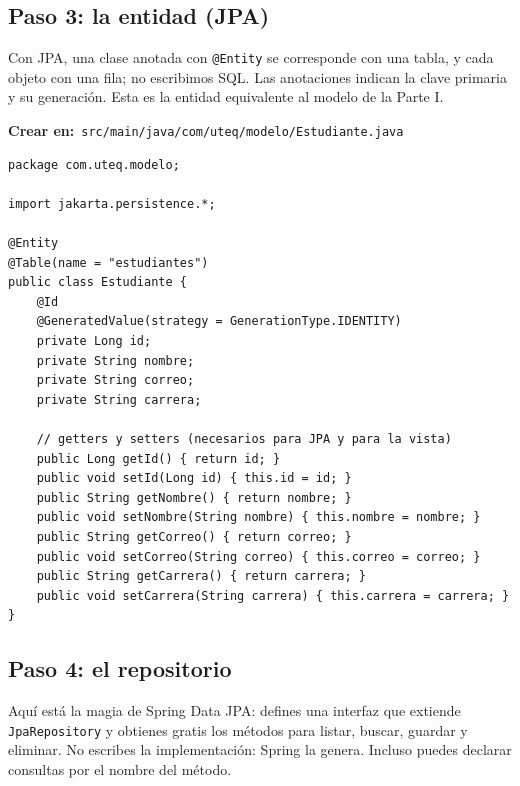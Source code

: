 \documentclass[11pt]{article}
\begin{document}
\subsection{Paso 3: la entidad (JPA)}
Con JPA, una clase anotada con \texttt{@Entity} se corresponde con una tabla, y cada objeto con una fila; no escribimos SQL. Las anotaciones indican la clave primaria y su generación. Esta es la entidad equivalente al modelo de la Parte I.

{\small\color{jwebazulo}\textbf{Crear en:}~}\texttt{src/\allowbreak{}main/\allowbreak{}java/\allowbreak{}com/\allowbreak{}uteq/\allowbreak{}modelo/\allowbreak{}Estudiante.\allowbreak{}java}\par\nobreak\vspace{-1pt}
\begin{cajacodigo}
\begin{lstlisting}[style=java]
package com.uteq.modelo;

import jakarta.persistence.*;

@Entity
@Table(name = "estudiantes")
public class Estudiante {
    @Id
    @GeneratedValue(strategy = GenerationType.IDENTITY)
    private Long id;
    private String nombre;
    private String correo;
    private String carrera;

    // getters y setters (necesarios para JPA y para la vista)
    public Long getId() { return id; }
    public void setId(Long id) { this.id = id; }
    public String getNombre() { return nombre; }
    public void setNombre(String nombre) { this.nombre = nombre; }
    public String getCorreo() { return correo; }
    public void setCorreo(String correo) { this.correo = correo; }
    public String getCarrera() { return carrera; }
    public void setCarrera(String carrera) { this.carrera = carrera; }
}
\end{lstlisting}
\end{cajacodigo}
\vspace{2pt}
\subsection{Paso 4: el repositorio}
Aquí está la magia de Spring Data JPA: defines una interfaz que extiende \texttt{Jpa\allowbreak{}Repository} y obtienes gratis los métodos para listar, buscar, guardar y eliminar. No escribes la implementación: Spring la genera. Incluso puedes declarar consultas por el nombre del método.
\end{document}
